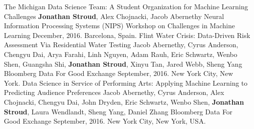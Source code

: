 \begin{cventries}
    \pubentry
        {The Michigan Data Science Team: A Student Organization for Machine Learning Challenges}
        {\textbf{Jonathan Stroud}, Alex Chojnacki, Jacob Abernethy}
        {Neural Information Processing Systems (NIPS) Workshop on Challenges in Machine Learning}
        {December, 2016.}
        {Barcelona, Spain.}
        {}
    \pubentry
        {Flint Water Crisis: Data-Driven Risk Assessment Via Residential Water Testing}
        {Jacob Abernethy, Cyrus Anderson, Chengyu Dai, Arya Farahi, Linh Nguyen, Adam Rauh, Eric Schwartz, Wenbo Shen, Guangsha Shi, \textbf{Jonathan Stroud}, Xinyu Tan, Jared Webb, Sheng Yang}
        {Bloomberg Data For Good Exchange}
        {September, 2016.}
        {New York City, New York.}
        {}
    \pubentry
        {Data Science in Service of Performing Arts: Applying Machine Learning to Predicting Audience Preferences}
        {Jacob Abernethy, Cyrus Anderson, Alex Chojnacki, Chengyu Dai,
          John Dryden, Eric Schwartz, Wenbo Shen, \textbf{Jonathan
            Stroud}, Laura Wendlandt, Sheng Yang, Daniel Zhang}
        {Bloomberg Data For Good Exchange}
        {September, 2016.}
        {New York City, New York, USA.}
        {}
\end{cventries}
